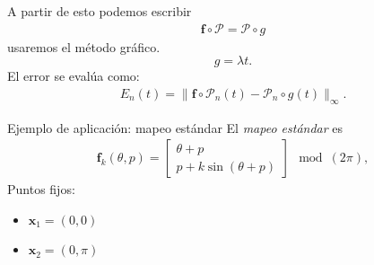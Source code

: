 \documentclass[11pt]{beamer}
\theoremstyle{definition}
\begin{document}
\begin{frame}
A partir de esto podemos escribir
\begin{eqnarray}
\mathbf{f} \circ \mathcal{P} =\mathcal{P}  \circ g
\label{Ecua de invariancia}
\end{eqnarray}
usaremos el m\'etodo gr\'afico.
\begin{equation}
g=\lambda t.
\end{equation}
El error se evalúa como:
\begin{eqnarray}
E_{n}(t) = \parallel \mathbf{f} \circ \mathcal{P}_{n}(t) - \mathcal{P}_{n} \circ g(t) \parallel_{\infty}.  \label{Ecua de invariancia resta}
\end{eqnarray}
\end{frame}




\begin{frame}{Ejemplo de aplicaci\'on: mapeo est\'andar}
El \textit{mapeo estándar} es
\begin{eqnarray}
\mathbf{f}_{k}(\theta,p) = \left[\begin{array}{c}
\theta + p \\
p + k\sin(\theta +p)
\end{array}\right] \mod(2\pi),  \label{mapeo estandar}
\end{eqnarray}
Puntos fijos:
\begin{itemize}
\item $\mathbf{x}_{1}=(0,0)$
\item $\mathbf{x}_{2}=(0,\pi)$
\end{itemize}

\end{frame}
\end{document}
